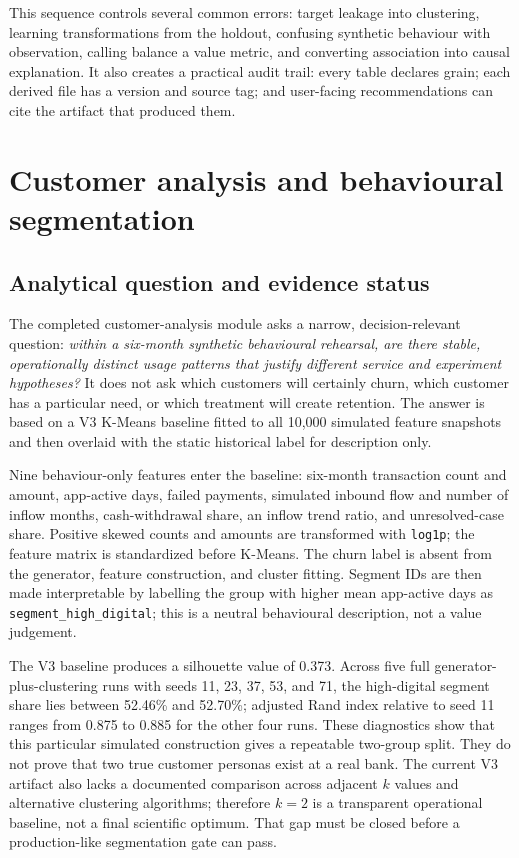 \documentclass[a4paper,12pt]{article}
\begin{document}
This sequence controls several common errors: target leakage into clustering, learning transformations from the holdout, confusing synthetic behaviour with observation, calling balance a value metric, and converting association into causal explanation. It also creates a practical audit trail: every table declares grain; each derived file has a version and source tag; and user-facing recommendations can cite the artifact that produced them.

\section{Customer analysis and behavioural segmentation}

\subsection{Analytical question and evidence status}

The completed customer-analysis module asks a narrow, decision-relevant question: \emph{within a six-month synthetic behavioural rehearsal, are there stable, operationally distinct usage patterns that justify different service and experiment hypotheses?} It does not ask which customers will certainly churn, which customer has a particular need, or which treatment will create retention. The answer is based on a V3 K-Means baseline fitted to all 10,000 simulated feature snapshots and then overlaid with the static historical label for description only.

Nine behaviour-only features enter the baseline: six-month transaction count and amount, app-active days, failed payments, simulated inbound flow and number of inflow months, cash-withdrawal share, an inflow trend ratio, and unresolved-case share. Positive skewed counts and amounts are transformed with \texttt{log1p}; the feature matrix is standardized before K-Means. The churn label is absent from the generator, feature construction, and cluster fitting. Segment IDs are then made interpretable by labelling the group with higher mean app-active days as \texttt{segment\_high\_digital}; this is a neutral behavioural description, not a value judgement.

The V3 baseline produces a silhouette value of 0.373. Across five full generator-plus-clustering runs with seeds 11, 23, 37, 53, and 71, the high-digital segment share lies between 52.46\% and 52.70\%; adjusted Rand index relative to seed 11 ranges from 0.875 to 0.885 for the other four runs. These diagnostics show that this particular simulated construction gives a repeatable two-group split. They do not prove that two true customer personas exist at a real bank. The current V3 artifact also lacks a documented comparison across adjacent $k$ values and alternative clustering algorithms; therefore $k=2$ is a transparent operational baseline, not a final scientific optimum. That gap must be closed before a production-like segmentation gate can pass.
\end{document}
